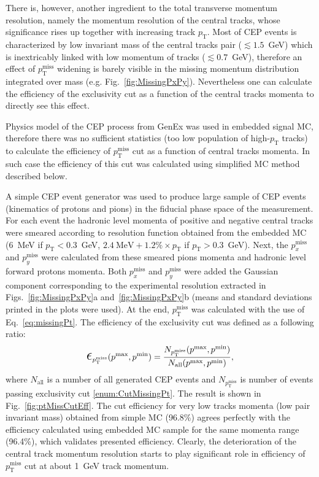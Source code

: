 There is, however, another ingredient to the total transverse momentum resolution, namely the momentum resolution of the central tracks, whose significance rises up together with increasing track $p_{\text{T}}$. Most of CEP events is characterized by low invariant mass of the central tracks pair ($\lesssim 1.5$~GeV) which is inextricably linked with low momentum of tracks ($\lesssim 0.7$~GeV), therefore an effect of $p_{\text{T}}^{\text{miss}}$ widening is barely visible in the missing momentum distribution integrated over mass (e.g. Fig.~\ref{fig:MissingPxPy}). Nevertheless one can calculate the efficiency of the exclusivity cut as a function of the central tracks momenta to directly see this effect.

Physics model of the CEP process from GenEx was used in embedded signal MC, therefore there was no sufficient statistics (too low population of high-$p_{\text{T}}$ tracks) to calculate the efficiency of $p_{\text{T}}^{\text{miss}}$ cut as a function of central tracks momenta. In such case the efficiency of this cut was calculated using simplified MC method described below.

A simple CEP event generator was used to produce large sample of CEP events (kinematics of protons and pions) in the fiducial phase space of the measurement. For each event the hadronic level momenta of positive and negative central tracks were smeared according to resolution function obtained from the embedded MC (6~MeV if $p_{\text{T}}<0.3$~GeV, $2.4~\text{MeV} + 1.2\%\times p_{\text{T}}$ if $p_{\text{T}}>0.3$~GeV). Next, the $p_{x}^{\text{miss}}$ and $p_{y}^{\text{miss}}$ were calculated from these smeared pions momenta and hadronic level forward protons momenta. Both $p_{x}^{\text{miss}}$ and $p_{y}^{\text{miss}}$ were added the Gaussian component corresponding to the experimental resolution extracted in Figs.~\ref{fig:MissingPxPy}a and~\ref{fig:MissingPxPy}b (means and standard deviations printed in the plots were used). At the end, $p_{\text{T}}^{\text{miss}}$ was calculated with the use of Eq.~\eqref{eq:missingPt}. The efficiency of the exclusivity cut was defined as a following ratio:
\begin{equation}\label{eq:ptMissCutEff}
 \mbox{\LARGE$\epsilon$}_{p_{\text{T}}^{\text{miss}}}(p^{\text{max}}, p^{\text{min}}) = \frac{N_{p_{\text{T}}^{\text{miss}}}(p^{\text{max}}, p^{\text{min}})}{N_{\text{all}}(p^{\text{max}}, p^{\text{min}})},
\end{equation}
where $N_{\text{all}}$ is a number of all generated CEP events and $N_{p_{\text{T}}^{\text{miss}}} $ is number of events passing exclusivity cut \ref{enum:CutMissingPt}. The result is shown in Fig.~\ref{fig:ptMissCutEff}. The cut efficiency for very low tracks momenta (low pair invariant mass) obtained from simple MC (96.8\%) agrees perfectly with the efficiency calculated using embedded MC sample for the same momenta range (96.4\%), which validates presented efficiency. Clearly, the deterioration of the central track momentum resolution starts to play significant role in efficiency of $p_{\text{T}}^{\text{miss}}$ cut at about 1~GeV track momentum.


